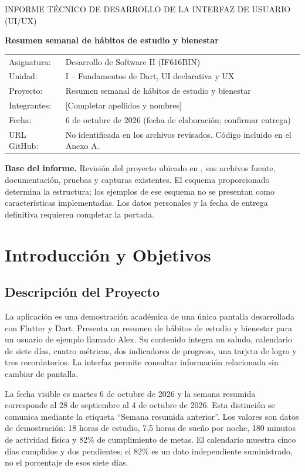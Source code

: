 \documentclass[12pt,a4paper]{article}
\newcommand{\codigo}[1]{\texttt{\detokenize{#1}}}
\begin{document}
\begin{titlepage}
\centering
{\Large INFORME TÉCNICO DE DESARROLLO DE LA INTERFAZ DE USUARIO (UI/UX)\par}
\vspace{1.5cm}
{\LARGE\bfseries Resumen semanal de hábitos de estudio y bienestar\par}
\vspace{1.5cm}
\begin{tabular}{p{3.4cm}p{9cm}}
Asignatura: & Desarrollo de Software II (IF616BIN)\\[0.4cm]
Unidad: & I -- Fundamentos de Dart, UI declarativa y UX\\[0.4cm]
Proyecto: & Resumen semanal de hábitos de estudio y bienestar\\[0.4cm]
Integrantes: & [Completar apellidos y nombres]\\[0.4cm]
Fecha: & 6 de octubre de 2026 (fecha de elaboración; confirmar entrega)\\[0.4cm]
URL GitHub: & No identificada en los archivos revisados. Código incluido en el Anexo A.
\end{tabular}
\vfill
\begin{flushleft}
\textbf{Base del informe.} Revisión del proyecto ubicado en \codigo{E:\desII}, sus archivos fuente, documentación, pruebas y capturas existentes. El esquema proporcionado determina la estructura; los ejemplos de ese esquema no se presentan como características implementadas. Los datos personales y la fecha de entrega definitiva requieren completar la portada.
\end{flushleft}
\end{titlepage}
\tableofcontents
\newpage
\section{Introducción y Objetivos}
\subsection{Descripción del Proyecto}
La aplicación es una demostración académica de una única pantalla desarrollada con Flutter y Dart. Presenta un resumen de hábitos de estudio y bienestar para un usuario de ejemplo llamado Alex. Su contenido integra un saludo, calendario de siete días, cuatro métricas, dos indicadores de progreso, una tarjeta de logro y tres recordatorios. La interfaz permite consultar información relacionada sin cambiar de pantalla.

La fecha visible es martes 6 de octubre de 2026 y la semana resumida corresponde al 28 de septiembre al 4 de octubre de 2026. Esta distinción se comunica mediante la etiqueta ``Semana resumida anterior''. Los valores son datos de demostración: 18 horas de estudio, 7,5 horas de sueño por noche, 180 minutos de actividad física y 82\% de cumplimiento de metas. El calendario muestra cinco días cumplidos y dos pendientes; el 82\% es un dato independiente suministrado, no el porcentaje de esos siete días.
\end{document}
